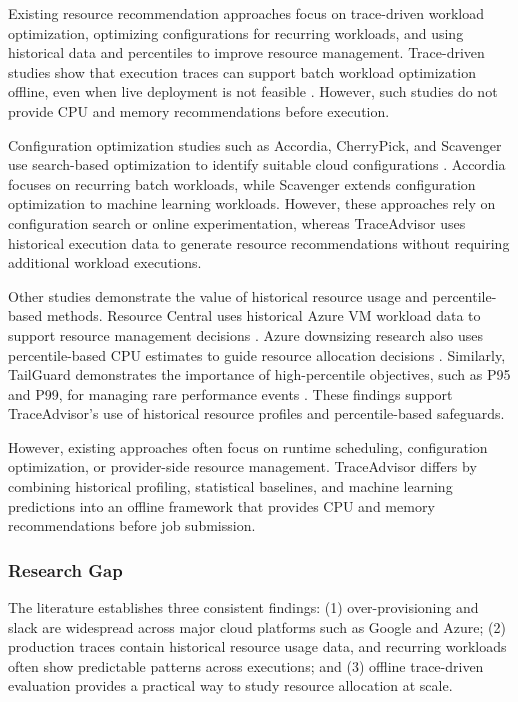\documentclass{IEEEtran}
\begin{document}
Existing resource recommendation approaches focus on trace-driven workload optimization, optimizing configurations for recurring workloads, and using historical data and percentiles to improve resource management. Trace-driven studies show that execution traces can support batch workload optimization offline, even when live deployment is not feasible \cite{ref14}. However, such studies do not provide CPU and memory recommendations before execution.

Configuration optimization studies such as Accordia, CherryPick, and Scavenger use search-based optimization to identify suitable cloud configurations \cite{ref3,ref15,ref16}. Accordia focuses on recurring batch workloads, while Scavenger extends configuration optimization to machine learning workloads. However, these approaches rely on configuration search or online experimentation, whereas TraceAdvisor uses historical execution data to generate resource recommendations without requiring additional workload executions.

Other studies demonstrate the value of historical resource usage and percentile-based methods. Resource Central uses historical Azure VM workload data to support resource management decisions \cite{ref2}. Azure downsizing research also uses percentile-based CPU estimates to guide resource allocation decisions \cite{ref17}. Similarly, TailGuard demonstrates the importance of high-percentile objectives, such as P95 and P99, for managing rare performance events \cite{ref18}. These findings support TraceAdvisor's use of historical resource profiles and percentile-based safeguards.

However, existing approaches often focus on runtime scheduling, configuration optimization, or provider-side resource management. TraceAdvisor differs by combining historical profiling, statistical baselines, and machine learning predictions into an offline framework that provides CPU and memory recommendations before job submission.

\subsubsection{Research Gap}\label{sec:1.3.4}

The literature establishes three consistent findings: (1) over-provisioning and slack are widespread across major cloud platforms such as Google and Azure; (2) production traces contain historical resource usage data, and recurring workloads often show predictable patterns across executions; and (3) offline trace-driven evaluation provides a practical way to study resource allocation at scale.
\end{document}
